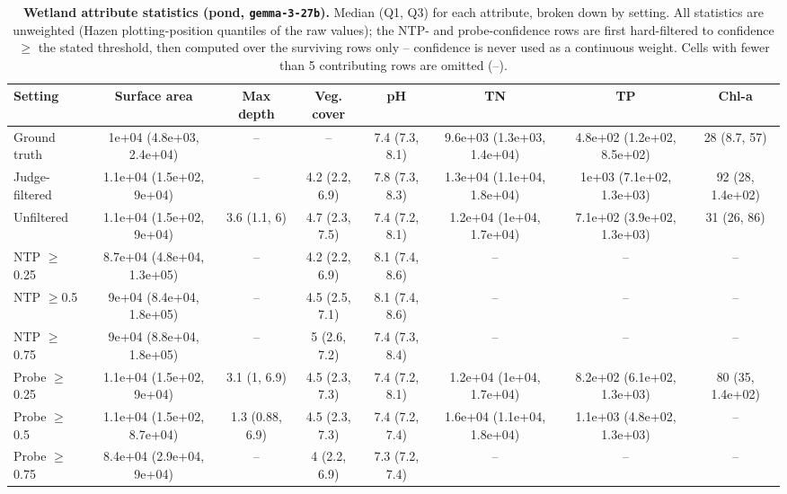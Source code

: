 \begin{table}[ht]
\centering
\begin{tabular}{lccccccc}
\toprule
Setting & Surface area & Max depth & Veg. cover & pH & TN & TP & Chl-a \\
\midrule
Ground truth & 1e+04 (4.8e+03, 2.4e+04) & -- & -- & 7.4 (7.3, 8.1) & 9.6e+03 (1.3e+03, 1.4e+04) & 4.8e+02 (1.2e+02, 8.5e+02) & 28 (8.7, 57) \\
Judge-filtered & 1.1e+04 (1.5e+02, 9e+04) & -- & 4.2 (2.2, 6.9) & 7.8 (7.3, 8.3) & 1.3e+04 (1.1e+04, 1.8e+04) & 1e+03 (7.1e+02, 1.3e+03) & 92 (28, 1.4e+02) \\
Unfiltered & 1.1e+04 (1.5e+02, 9e+04) & 3.6 (1.1, 6) & 4.7 (2.3, 7.5) & 7.4 (7.2, 8.1) & 1.2e+04 (1e+04, 1.7e+04) & 7.1e+02 (3.9e+02, 1.3e+03) & 31 (26, 86) \\
NTP $\geq$0.25 & 8.7e+04 (4.8e+04, 1.3e+05) & -- & 4.2 (2.2, 6.9) & 8.1 (7.4, 8.6) & -- & -- & -- \\
NTP $\geq$0.5 & 9e+04 (8.4e+04, 1.8e+05) & -- & 4.5 (2.5, 7.1) & 8.1 (7.4, 8.6) & -- & -- & -- \\
NTP $\geq$0.75 & 9e+04 (8.8e+04, 1.8e+05) & -- & 5 (2.6, 7.2) & 7.4 (7.3, 8.4) & -- & -- & -- \\
Probe $\geq$0.25 & 1.1e+04 (1.5e+02, 9e+04) & 3.1 (1, 6.9) & 4.5 (2.3, 7.3) & 7.4 (7.2, 8.1) & 1.2e+04 (1e+04, 1.7e+04) & 8.2e+02 (6.1e+02, 1.3e+03) & 80 (35, 1.4e+02) \\
Probe $\geq$0.5 & 1.1e+04 (1.5e+02, 8.7e+04) & 1.3 (0.88, 6.9) & 4.5 (2.3, 7.3) & 7.4 (7.2, 7.4) & 1.6e+04 (1.1e+04, 1.8e+04) & 1.1e+03 (4.8e+02, 1.3e+03) & -- \\
Probe $\geq$0.75 & 8.4e+04 (2.9e+04, 9e+04) & -- & 4 (2.2, 6.9) & 7.3 (7.2, 7.4) & -- & -- & -- \\
\bottomrule
\end{tabular}
\caption{\textbf{Wetland attribute statistics (pond, \texttt{gemma-3-27b}).} Median (Q1, Q3) for each attribute, broken down by setting. All statistics are unweighted (Hazen plotting-position quantiles of the raw values); the NTP- and probe-confidence rows are first hard-filtered to confidence $\geq$ the stated threshold, then computed over the surviving rows only -- confidence is never used as a continuous weight. Cells with fewer than 5 contributing rows are omitted (--).}
\label{tab:meta-pond-gemma-3-27b-wetland}
\end{table}
